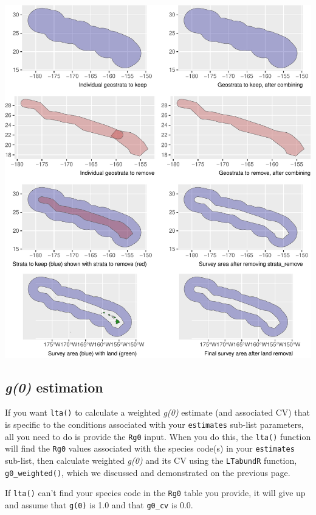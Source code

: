 \documentclass[
]{book}
\begin{document}
\includegraphics{figures/unnamed-chunk-258-1.pdf}

\hypertarget{g0-estimation}{%
\subsection*{\texorpdfstring{\emph{g(0)} estimation}{g(0) estimation}}\label{g0-estimation}}

If you want \texttt{lta()} to calculate a weighted \emph{g(0)} estimate (and associated CV) that is specific to the conditions associated with your \texttt{estimates} sub-list parameters, all you need to do is provide the \texttt{Rg0} input. When you do this, the \texttt{lta()} function will find the \texttt{Rg0} values associated with the species code(s) in your \texttt{estimates} sub-list, then calculate weighted \emph{g(0)} and its CV using the \texttt{LTabundR} function, \texttt{g0\_weighted()}, which we discussed and demonstrated on the previous page.

If \texttt{lta()} can't find your species code in the \texttt{Rg0} table you provide, it will give up and assume that \texttt{g(0)} is 1.0 and that \texttt{g0\_cv} is 0.0.
\end{document}
